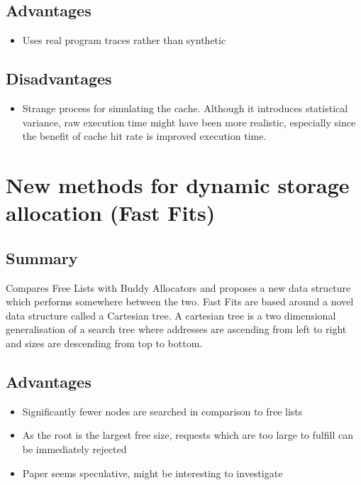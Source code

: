 \documentclass{report}
\begin{document}
\subsection{Advantages}
\begin{itemize}
	\item{Uses real program traces rather than synthetic}
\end{itemize}

\subsection{Disadvantages}
\begin{itemize}
	\item{Strange process for simulating the cache. Although it introduces statistical variance, raw execution time might have been more realistic, especially since the benefit of cache hit rate is improved execution time.}
\end{itemize}

\section[Fast Fits]{New methods for dynamic storage allocation (Fast Fits) \cite{10.1145/773379.806613}}
\subsection{Summary}
Compares Free Lists with Buddy Allocators and proposes a new data structure which performs somewhere between the two. Fast Fits are based around a novel data structure called a Cartesian tree. A cartesian tree is a two dimensional generalisation of a search tree where addresses are ascending from left to right and sizes are descending from top to bottom.
\subsection{Advantages}
\begin{itemize}
	\item{Significantly fewer nodes are searched in comparison to free lists}
	\item{As the root is the largest free size, requests which are too large to fulfill can be immediately rejected}
	\item{Paper seems speculative, might be interesting to investigate}
\end{itemize}
\end{document}
